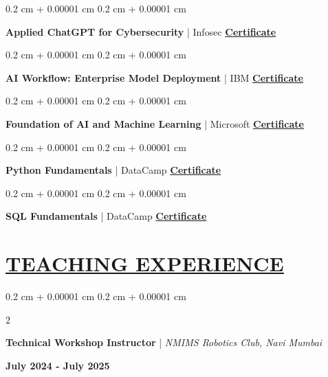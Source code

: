 \documentclass[10pt, letterpaper]{article}
\newenvironment{onecolentry}{
    \begin{adjustwidth}{
        0.2 cm + 0.00001 cm
    }{
        0.2 cm + 0.00001 cm
    }
}{
    \end{adjustwidth}
} %
\newenvironment{twocolentry}[2][]{
    \onecolentry
    \def\secondColumn{#2}
    \setcolumnwidth{\fill, 5.0 cm}
    \begin{paracol}{2}
}{
    \switchcolumn \raggedleft \secondColumn
    \end{paracol}
    \endonecolentry
} %
\begin{document}
\vspace{0.04cm}

\begin{onecolentry}
    \textbf{Applied ChatGPT for Cybersecurity} | Infosec
    \hfill \href{https://coursera.org/share/7f136e182829680e0a2a253c100a236c}{\textbf{Certificate}}
\end{onecolentry}

\vspace{0.04cm}
\begin{onecolentry}
    \textbf{AI Workflow: Enterprise Model Deployment} | IBM
    \hfill \href{https://coursera.org/share/56698a1a21fcf57504960591141a5cc0}{\textbf{Certificate}}
\end{onecolentry}


\vspace{0.04cm}

\begin{onecolentry}
    \textbf{Foundation of AI and Machine Learning} | Microsoft
    \hfill \href{https://coursera.org/share/98c2dd20e53277df4713b475206964f6}{\textbf{Certificate}}
\end{onecolentry}

\vspace{0.04cm}


\begin{onecolentry}
    \textbf{Python Fundamentals} | DataCamp
    \hfill \href{https://www.datacamp.com/completed/statement-of-accomplishment/track/51765a61a3aff9842fe8856a5bed7d336bb5f627}{\textbf{Certificate}}
\end{onecolentry}

\vspace{0.04cm}

\begin{onecolentry}
    \textbf{SQL Fundamentals} | DataCamp
    \hfill \href{https://www.datacamp.com/statement-of-accomplishment/track/956081f0c68a4da735f93ee2177ced96b2b21500?raw=1}{\textbf{Certificate}}
\end{onecolentry}

\section{\href{https://www.harjot.info/\#Education}{TEACHING EXPERIENCE}}

\begin{twocolentry}{
    \textbf{July 2024 - July 2025}}
    \textbf{Technical Workshop Instructor} | \textit{NMIMS Robotics Club, Navi Mumbai}
\end{twocolentry}
\end{document}
